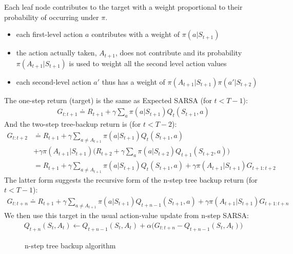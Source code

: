 \documentclass[sutton_barto_notes.tex]{subfiles}
\begin{document}
Each leaf node contributes to the target with a weight proportional to their probability of occurring under $\pi$.
\begin{itemize}
\item each first-level action $a$ contributes with a weight of $\pi(a|S_{t+1})$
\item the action actually taken, $A_{t+1}$, does not contribute and its probability $\pi(A_{t+1} | S_{t+1})$ is used to weight all the second level action values
\item each second-level action $a'$ thus has a weight of $\pi(A_{t+1} | S_{t+1}) \pi (a' | S_{t+2})$
\end{itemize}
The one-step return (target) is the same as Expected SARSA (for $t < T - 1$):
\begin{align*}
G_{t:t+1} \doteq R_{t+1} + \gamma \sum_a \pi(a| S_{t+1}) Q_t(S_{t+1}, a) \label{eq:7.14}\tag{7.14}
\end{align*}
And the two-step tree-backup return is (for $t < T - 2$):
\begin{equation} \label{eq4}
\begin{split}
G_{t:t+2} & \doteq R_{t+1} + \gamma \sum_{a \neq A_{t+1}} \pi(a| S_{t+1}) Q_t(S_{t+1}, a) \\
& + \gamma \pi(A_{t+1}|S_{t+1}) \big(R_{t+2} + \gamma \sum_a \pi(a|S_{t+2}) Q_{t+1}(S_{t+2}, a)\big)\\
 & = R_{t+1} + \gamma \sum_{a \neq A_{t+1}} \pi(a| S_{t+1}) Q_t(S_{t+1}, a) + \gamma \pi(A_{t+1}|S_{t+1}) G_{t+1:t+2}
\end{split}
\end{equation}
The latter form suggests the recursive form of the n-step tree backup return (for $t < T - 1$):
\begin{align}
G_{t:t+n} \doteq R_{t+1} + \gamma \sum_{a \neq A_{t+1}} \pi(a| S_{t+1}) Q_{t+n-1}(S_{t+1}, a) + \gamma \pi(A_{t+1}|S_{t+1}) G_{t+1:t+n} \label{eq:7.15}\tag{7.15}
\end{align}
We then use this target in the usual action-value update from n-step SARSA:
\begin{align}
Q_{t+n}(S_t, A_t) \gets Q_{t+n-1}(S_t, A_t)  + \alpha \big(G_{t:t+n} - Q_{t+n-1}(S_t, A_t)\big) \label{eq:7.16}\tag{7.16}
\end{align}

\begin{figure}[h!]
    \centering
    \caption{ n-step tree backup algorithm }
\end{figure}
\end{document}
